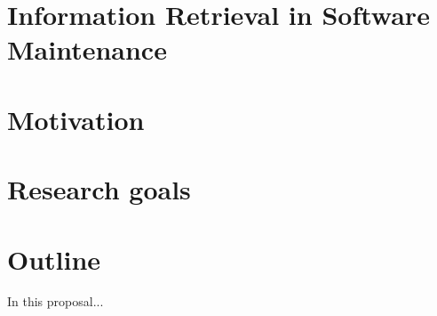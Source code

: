\begin{comment}
- Introduction
- Related work
- Previous work
- Proposed work
- Projected schedule
- Conclusion
\end{comment}

\section{Information Retrieval in Software Maintenance}
\section{Motivation}
\section{Research goals}
\section{Outline}
In this proposal...
